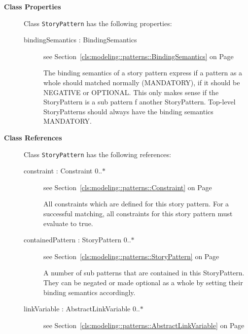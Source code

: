\begin{description}

	\item[\textbf{Class Properties}] Class \texttt{StoryPattern} has the following properties:
	\begin{description}
\item[bindingSemantics : BindingSemantics 	]
see Section~\ref{cls:modeling::patterns::BindingSemantics} on Page~\pageref{cls:modeling::patterns::BindingSemantics}
\hspace{\fill}
\nopagebreak


	
			
The binding semantics of a story pattern express if a pattern as a whole should matched normally (MANDATORY), if it should be NEGATIVE or OPTIONAL. This only makes sense if the StoryPattern is a sub pattern f another StoryPattern. Top-level StoryPatterns should always have the binding semantics MANDATORY.	
		
	
	\end{description}
	
	\item[\textbf{Class References}] Class \texttt{StoryPattern} has the following references:
	\begin{description}
\item[constraint : Constraint 			0..$*$]
see Section~\ref{cls:modeling::patterns::Constraint} on Page~\pageref{cls:modeling::patterns::Constraint}
\hspace{\fill}
\nopagebreak


	
			
All constraints which are defined for this story pattern. For a successful matching, all constraints for this story pattern must evaluate to true.	
		
	
\item[containedPattern : StoryPattern 			0..$*$]
see Section~\ref{cls:modeling::patterns::StoryPattern} on Page~\pageref{cls:modeling::patterns::StoryPattern}
\hspace{\fill}
\nopagebreak


	
			
A number of sub patterns that are contained in this StoryPattern. They can be negated or made optional as a whole by setting their binding semantics accordingly.	
		
	
\item[linkVariable : AbstractLinkVariable 			0..$*$]
see Section~\ref{cls:modeling::patterns::AbstractLinkVariable} on Page~\pageref{cls:modeling::patterns::AbstractLinkVariable}
\hspace{\fill}
\nopagebreak



\end{description}
\end{description}
